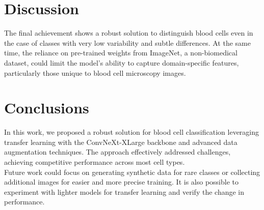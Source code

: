 \documentclass[11pt]{article}
\begin{document}
\begin{multicols}{2}
        \section{Discussion}
        The final achievement shows a robust solution to distinguish blood cells even in the case of classes with very low variability and subtle differences. At the same time, the reliance on pre-trained weights from ImageNet, a non-biomedical dataset, could limit the model's ability to capture domain-specific features, particularly those unique to blood cell microscopy images. 

        \section{Conclusions}
	In this work, we proposed a robust solution for blood cell classification leveraging transfer learning with the ConvNeXt-XLarge backbone and advanced data augmentation techniques. The approach effectively addressed challenges, achieving competitive performance across most cell types. \\
Future work could focus on generating synthetic data for rare classes or collecting additional images for easier and more precise training. It is also possible to experiment with lighter models for transfer learning and verify the change in performance.
\cite{mixup}
        


        
        
    
    \end{multicols}
\end{document}
